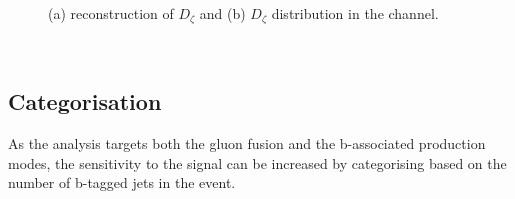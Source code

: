 \begin{figure}[h!]
\begin{center}
\end{center}
\caption[Reconstruction of the $D_{\zeta}$ variable and the $D_{\zeta}$ distribution
in the \emu channel.]{(a) reconstruction of $D_{\zeta}$ \cite{cdf-dzeta} and (b) $D_{\zeta}$ distribution in the 
\emu channel\cite{CMS-PAS-HIG-16-037}.}
\label{fig:mssm_dzeta}
\end{figure}
~\clearpage
\subsection{Categorisation}
\label{sec:mssm_eventsel_categories}
As the analysis targets both the gluon fusion
and the b-associated production modes, 
the sensitivity to the signal can be increased by categorising
based on the number of b-tagged jets in the event.

